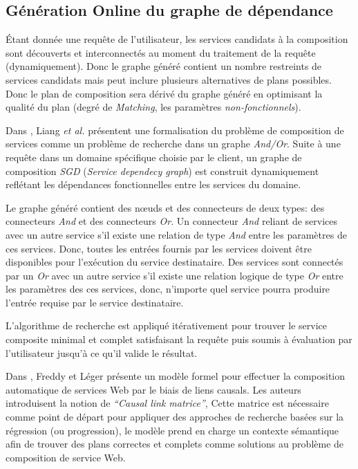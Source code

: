   \newpage
  \subsection{Génération Online du graphe de dépendance}
  \label{sec:generation-online}
  Étant donnée une requête de l'utilisateur, les services candidats à
  la composition sont découverts et interconnectés au moment du
  traitement de la requête (dynamiquement). Donc le graphe généré
  contient un nombre restreints de services candidats mais peut
  inclure plusieurs alternatives de plans possibles. Donc le plan de
  composition sera dérivé du graphe généré en optimisant la qualité du
  plan (degré de \textit{Matching}, les paramètres
  \textit{non-fonctionnels}).\bigskip

  Dans \cite{liang2005and}, Liang \textit{et al.} présentent une
  formalisation du problème de composition de services comme un
  problème de recherche dans un graphe \textit{And/Or}. Suite à une
  requête dans un domaine spécifique choisie par le client, un graphe
  de composition \textit{SGD} (\textit{Service dependecy graph}) est
  construit dynamiquement reflétant les dépendances fonctionnelles
  entre les services du domaine.\medskip

  Le graphe généré contient des nœuds et des connecteurs de deux
  types: des connecteurs \textit{And} et des connecteurs
  \textit{Or}. Un connecteur \textit{And} reliant de services avec un
  autre service s'il existe une relation de type \textit{And} entre
  les paramètres de ces services. Donc, toutes les entrées fournis par
  les services doivent être disponibles pour l'exécution du service
  destinataire. Des services sont connectés par un \textit{Or} avec un
  autre service s'il existe une relation logique de type \textit{Or}
  entre les paramètres des ces services, donc, n'importe quel service
  pourra produire l'entrée requise par le service
  destinataire.\medskip

  L'algorithme de recherche est appliqué itérativement pour trouver le
  service composite minimal et complet satisfaisant la requête puis
  soumis à évaluation par l'utilisateur jusqu'à ce qu'il valide le
  résultat.\bigskip

  Dans \cite{lecue2006formal}, Freddy et Léger présente un modèle
  formel pour effectuer la composition automatique de services Web par
  le biais de liens causals. Les auteurs introduisent la notion de
  \textit{``Causal link matrice''}, Cette matrice est nécessaire comme
  point de départ pour appliquer des approches de recherche basées sur
  la régression (ou progression), le modèle prend en charge un
  contexte sémantique afin de trouver des plans correctes et complets
  comme solutions au problème de composition de service Web.\bigskip

